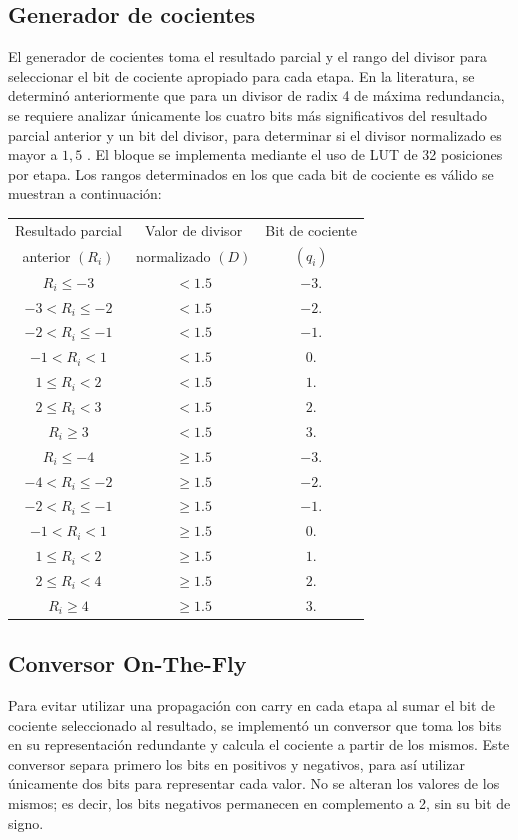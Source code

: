 \documentclass[12pt,a4paper]{article} %
\begin{document}
\subsection{Generador de cocientes}

El generador de cocientes toma el resultado parcial y el rango del divisor para seleccionar el bit de cociente apropiado para cada etapa. En la literatura, se determinó anteriormente que para un divisor de radix 4 de máxima redundancia, se requiere analizar únicamente los cuatro bits más significativos del resultado parcial anterior y un bit del divisor, para determinar si el divisor normalizado es mayor a $1,5$ \citep{Wey1999}. El bloque se implementa mediante el uso de LUT de 32 posiciones por etapa. Los rangos determinados en los que cada bit de cociente es válido se muestran a continuación:\newline

\begin{tabular}{c||c||c}
Resultado parcial & Valor de divisor & Bit de cociente\\
anterior $(R_i)$ & normalizado $(D)$ & $(q_i)$\\
\hline
\hline
$R_i\leq -3$ & $<1.5$ & $-3$. \\
$-3<R_i\leq -2$ & $<1.5$ & $-2$. \\
$-2<R_i\leq -1$ & $<1.5$ & $-1$. \\
$-1<R_i < 1$ & $<1.5$ & $0$. \\
$1\leq R_i < 2$ & $<1.5$ & $1$. \\
$2\leq R_i < 3$ & $<1.5$ & $2$. \\
$R_i \geq 3$ & $<1.5$ & $3$. \\
\hline
$R_i\leq -4$ & $\geq 1.5$ & $-3$. \\
$-4<R_i\leq -2$ & $\geq 1.5$ & $-2$. \\
$-2<R_i\leq -1$ & $\geq 1.5$ & $-1$. \\
$-1<R_i < 1$ & $\geq 1.5$ & $0$. \\
$1\leq R_i < 2$ & $\geq 1.5$ & $1$. \\
$2\leq R_i < 4$ & $\geq 1.5$ & $2$. \\
$R_i \geq 4$ & $\geq 1.5$ & $3$. \\
\end{tabular}

\subsection{Conversor On-The-Fly}

Para evitar utilizar una propagación con carry en cada etapa al sumar el bit de cociente seleccionado al resultado, se implementó un conversor que toma los bits en su representación redundante y calcula el cociente a partir de los mismos. Este conversor separa primero los bits en positivos y negativos, para así utilizar únicamente dos bits para representar cada valor. No se alteran los valores de los mismos; es decir, los bits negativos permanecen en complemento a 2, sin su bit de signo. \\
\end{document}
